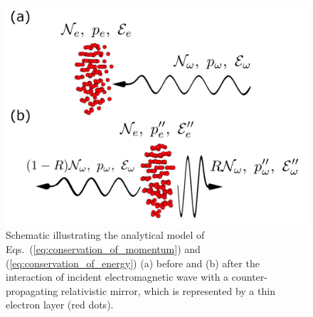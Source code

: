 \documentclass[10pt, a4paper, twoside, openright]{report}
\begin{document}

\begin{figure}[t]
	\includegraphics[width=0.475\linewidth]{img/recoil_scheme.png}
	\caption[]{\label{fig:recoil_schematic} Schematic illustrating the analytical model of Eqs.~(\ref{eq:conservation_of_momentum}) and (\ref{eq:conservation_of_energy}) (a) before and (b) after the interaction of incident electromagnetic wave with a counter-propagating relativistic mirror, which is represented by a thin electron layer (red dots).}
\end{figure}
\end{document}
